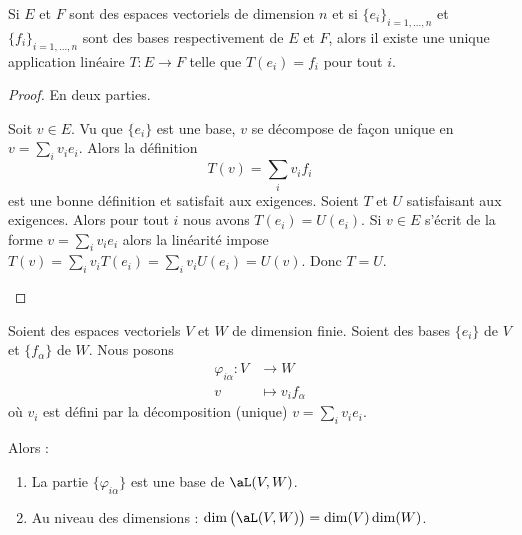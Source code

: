 \begin{proposition}
	Si \( E\) et \( F\) sont des espaces vectoriels de dimension \( n\) et si \( \{ e_i \}_{i=1,\ldots, n}\) et \( \{ f_i \}_{i=1,\ldots, n}\) sont des bases respectivement de \( E\) et \( F\), alors il existe une unique application linéaire \( T\colon E\to F\) telle que \( T(e_i)=f_i\) pour tout \( i\).
\end{proposition}

\begin{proof}
	En deux parties.\begin{subproof}
		\spitem[Existence]
		Soit \( v\in E\). Vu que \( \{ e_i \}\) est une base, \( v\) se décompose de façon unique en \( v=\sum_iv_ie_i\). Alors la définition
		\begin{equation}
			T(v)=\sum_iv_if_i
		\end{equation}
		est une bonne définition et satisfait aux exigences.
		\spitem[Unicité]
		Soient \( T\) et \( U\) satisfaisant aux exigences. Alors pour tout \( i\) nous avons \( T(e_i)=U(e_i)\). Si \( v\in E\) s'écrit de la forme \( v=\sum_iv_ie_i\) alors la linéarité impose \( T(v)=\sum_iv_iT(e_i)=\sum_iv_iU(e_i)=U(v)\). Donc \( T = U\).
	\end{subproof}
\end{proof}

\begin{lemma}       \label{LEMooJXFIooKDzRWR}
	Soient des espaces vectoriels \( V\) et \( W\) de dimension finie. Soient des bases \( \{e_i\}\) de \( V\) et \( \{f_{\alpha}\}\) de \( W\). Nous posons
	\begin{equation}
		\begin{aligned}
			\varphi_{i\alpha}\colon V & \to W                 \\
			v                         & \mapsto v_if_{\alpha}
		\end{aligned}
	\end{equation}
	où \( v_i\) est défini par la décomposition (unique) \( v=\sum_iv_ie_i\).

	Alors :
	\begin{enumerate}
		\item
		      La partie \( \{\varphi_{i\alpha}\} \) est une base de \( \aL(V,W)\).
		\item       \label{ITEMooPMLWooNbTyJI}
		      Au niveau des dimensions : \( \dim\big( \aL(V,W) \big)=\dim(V)\dim(W)\).
	\end{enumerate}
\end{lemma}

